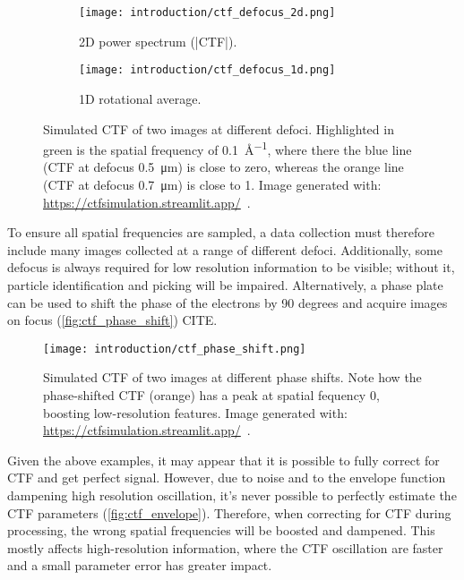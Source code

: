 \begin{figure}[ht]
    \centering
    \begin{subfigure}{.6\textwidth}
        \centering
        \texttt{[image: introduction/ctf\_defocus\_2d.png]}
        \caption{2D power spectrum (|CTF|).}
        \label{fig:ctf_defocus_2d}
    \end{subfigure}%

    \begin{subfigure}{\textwidth}
        \centering
        \texttt{[image: introduction/ctf\_defocus\_1d.png]}
        \caption{1D rotational average.}
        \label{fig:ctf_defocus_1d}
    \end{subfigure}%

    \caption[CTF: effect of defocus]{Simulated CTF of two images at different defoci. Highlighted in green is the spatial frequency of \qty{0.1}{\angstrom^{-1}}, where there the blue line (CTF at defocus \qty{0.5}{\micro\meter}) is close to zero, whereas the orange line (CTF at defocus \qty{0.7}{\micro\meter}) is close to 1. Image generated with: \url{https://ctfsimulation.streamlit.app/}~\cite{jiangWebbasedSimulationContrast2001}.}
    \label{fig:ctf_defocus}
\end{figure}

To ensure all spatial frequencies are sampled, a data collection must therefore include many images collected at a range of different defoci.
Additionally, some defocus is always required for low resolution information to be visible; without it, particle identification and picking will be impaired.
Alternatively, a phase plate can be used to shift the phase of the electrons by 90 degrees and acquire images on focus (\autoref{fig:ctf_phase_shift}) CITE.

\begin{figure}[ht]
    \centering
    \texttt{[image: introduction/ctf\_phase\_shift.png]}
    \caption[CTF: effect of phase shift]{Simulated CTF of two images at different phase shifts. Note how the phase-shifted CTF (orange) has a peak at spatial fequency \num{0}, boosting low-resolution features. Image generated with: \url{https://ctfsimulation.streamlit.app/}~\cite{jiangWebbasedSimulationContrast2001}.}
    \label{fig:ctf_phase_shift}
\end{figure}

Given the above examples, it may appear that it is possible to fully correct for CTF and get perfect signal.
However, due to noise and to the envelope function dampening high resolution oscillation, it's never possible to perfectly estimate the CTF parameters (\autoref{fig:ctf_envelope}).
Therefore, when correcting for CTF during processing, the wrong spatial frequencies will be boosted and dampened.
This mostly affects high-resolution information, where the CTF oscillation are faster and a small parameter error has greater impact.

